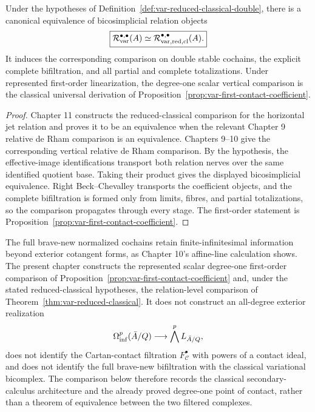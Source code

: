 \begin{theorem}
\label{thm:var-reduced-classical}
Under the hypotheses of Definition~\ref{def:var-reduced-classical-double}, there is a canonical equivalence of bicosimplicial relation objects
\[
    \boxed{
    \mathcal R_{\mathrm{var}}^{\bullet,\bullet}(A)
    \simeq
    \mathcal R_{\mathrm{var,red,cl}}^{\bullet,\bullet}(A).
    }
\]
It induces the corresponding comparison on double stable cochains, the explicit complete bifiltration, and all partial and complete totalizations. Under represented first-order linearization, the degree-one scalar vertical comparison is the classical universal derivation of Proposition~\ref{prop:var-first-contact-coefficient}.
\end{theorem}

\begin{proof}
Chapter 11 constructs the reduced-classical comparison for the horizontal jet relation and proves it to be an equivalence when the relevant Chapter 9 relative de Rham comparison is an equivalence. Chapters 9--10 give the corresponding vertical relative de Rham comparison. By the hypothesis, the effective-image identifications transport both relation nerves over the same identified quotient base. Taking their product gives the displayed bicosimplicial equivalence. Right Beck--Chevalley transports the coefficient objects, and the complete bifiltration is formed only from limits, fibres, and partial totalizations, so the comparison propagates through every stage. The first-order statement is Proposition~\ref{prop:var-first-contact-coefficient}.
\end{proof}

\begin{remark}
\label{rem:var-classical-contact}
The full brave-new normalized cochains retain finite-infinitesimal information beyond exterior cotangent forms, as Chapter 10's affine-line calculation shows.  The present chapter constructs the represented scalar degree-one first-order comparison of Proposition~\ref{prop:var-first-contact-coefficient} and, under the stated reduced-classical hypotheses, the relation-level comparison of Theorem~\ref{thm:var-reduced-classical}.  It does not construct an all-degree exterior realization
\[
    \Omega_{\mathrm{inf}}^p(\bar A/Q)
    \longrightarrow
    \bigwedge^pL_{\bar A/Q},
\]
does not identify the Cartan-contact filtration \(F_{\mathcal C}^\bullet\) with powers of a contact ideal, and does not identify the full brave-new bifiltration with the classical variational bicomplex.  The comparison below therefore records the classical secondary-calculus architecture and the already proved degree-one point of contact, rather than a theorem of equivalence between the two filtered complexes.
\end{remark}

